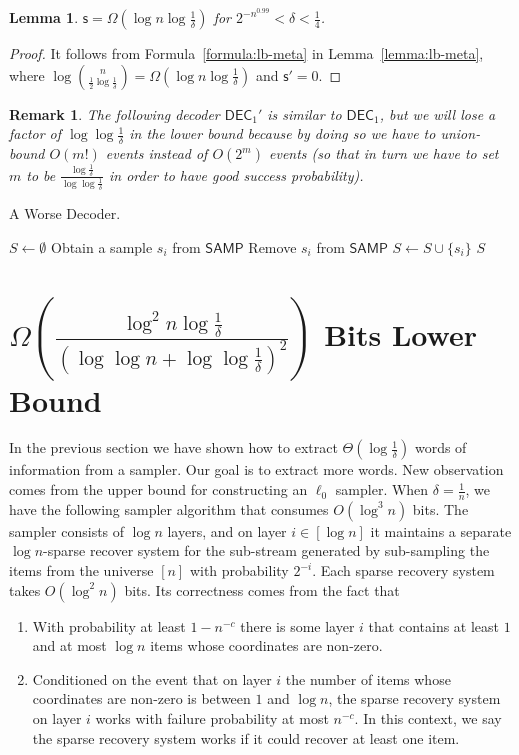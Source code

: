 \documentclass[10pt]{article}
\newtheorem{lemma}{Lemma}
\newtheorem{remark}{Remark}
\newcommand{\samp}{\textsf{SAMP}\xspace}
\newcommand{\dec}{\textsf{DEC}\xspace}
\newcommand{\s}{\textsf{s}\xspace}
\begin{document}
\begin{lemma}
  $\s = \Omega(\log n \log \frac{1}{\delta})$ for $2^{-n^{0.99}}<\delta<\frac{1}{4}$.
\end{lemma}

\begin{proof}
  It follows from Formula~\ref{formula:lb-meta} in Lemma~\ref{lemma:lb-meta}, where $\log {n \choose \frac{1}{2}\log \frac{1}{\delta}}=\Omega(\log n \log \frac{1}{\delta})$ and $\s'=0$. 
\end{proof}

\begin{remark}
  The following decoder $\dec_1'$ is similar to $\dec_1$, but we will lose a factor of $\log\log \frac{1}{\delta}$ in the lower bound because by doing so we have to union-bound $O(m!)$ events instead of $O(2^m)$ events (so that in turn we have to set $m$ to be $\frac{\log \frac{1}{\delta}}{\log\log\frac{1}{\delta}}$ in order to have good success probability). 
\end{remark}

\begin{algorithm}[H]
\caption{A Worse Decoder.}
\begin{algorithmic}[1]
\Procedure{$\dec_1'$}{\samp}
\State $S\leftarrow \emptyset$
\State Obtain a sample $s_i$ from $\samp$
\State Remove $s_i$ from $\samp$
\State $S \leftarrow S \cup \{s_i\}$
\EndFor
\State \Return $S$ 
\EndProcedure
\end{algorithmic}
\end{algorithm}


\section{$\Omega(\frac{\log^2 n\log{\frac{1}{\delta}}}{(\log\log n+\log\log \frac{1}{\delta})^2})$ Bits Lower Bound}

In the previous section we have shown how to extract $\Theta(\log \frac{1}{\delta})$ words of information from a sampler. 
Our goal is to extract more words. New observation comes from the upper bound for constructing an $\ell_0$ sampler. 
When $\delta=\frac{1}{n}$, we have the following sampler algorithm that consumes $O(\log^3 n)$ bits. 
The sampler consists of $\log n$ layers, and on layer $i\in [\log n]$ it maintains a separate $\log n$-sparse recover system for the sub-stream generated by sub-sampling the items from the universe $[n]$ with probability $2^{-i}$.
Each sparse recovery system takes $O(\log^2 n)$ bits. 
Its correctness comes from the fact that 
\begin{enumerate}
  \item With probability at least $1-n^{-c}$ there is some layer $i$ that contains at least $1$ and at most $\log n$ items whose coordinates are non-zero. 
  \item Conditioned on the event that on layer $i$ the number of items whose coordinates are non-zero is between $1$ and $\log n$, the sparse recovery system on layer $i$ works with failure probability at most $n^{-c}$. In this context, we say the sparse recovery system works if it could recover at least one item. 
\end{enumerate}
\end{document}
